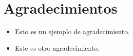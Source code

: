 \chapter{Agradecimientos}
    
    \begin{itemize}
        \item Esto es un ejemplo de agradecimiento.
        \item Este es otro agradecimiento.%
    \end{itemize}

